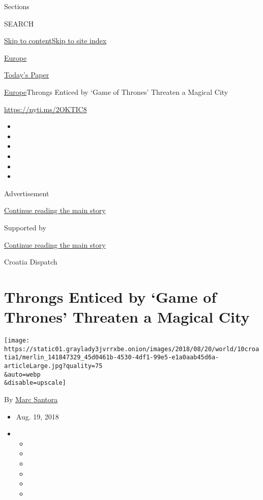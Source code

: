 Sections

SEARCH

\protect\hyperlink{site-content}{Skip to
content}\protect\hyperlink{site-index}{Skip to site index}

\href{https://www.nytimes3xbfgragh.onion/section/world/europe}{Europe}

\href{https://myaccount.nytimes3xbfgragh.onion/auth/login?response_type=cookie\&client_id=vi}{}

\href{https://www.nytimes3xbfgragh.onion/section/todayspaper}{Today's
Paper}

\href{/section/world/europe}{Europe}\textbar{}Throngs Enticed by `Game
of Thrones' Threaten a Magical City

\url{https://nyti.ms/2OKTIC8}

\begin{itemize}
\item
\item
\item
\item
\item
\item
\end{itemize}

Advertisement

\protect\hyperlink{after-top}{Continue reading the main story}

Supported by

\protect\hyperlink{after-sponsor}{Continue reading the main story}

Croatia Dispatch

\hypertarget{throngs-enticed-by-game-of-thrones-threaten-a-magical-city}{%
\section{Throngs Enticed by `Game of Thrones' Threaten a Magical
City}\label{throngs-enticed-by-game-of-thrones-threaten-a-magical-city}}

\texttt{[image: https://static01.graylady3jvrrxbe.onion/images/2018/08/20/world/10croatia1/merlin\_141847329\_45d0461b-4530-4df1-99e5-e1a0aab45d6a-articleLarge.jpg?quality=75\\\&auto=webp\\\&disable=upscale]}

By \href{https://www.nytimes3xbfgragh.onion/by/marc-santora}{Marc
Santora}

\begin{itemize}
\item
  Aug. 19, 2018
\item
  \begin{itemize}
  \item
  \item
  \item
  \item
  \item
  \item
  \end{itemize}
\end{itemize}

